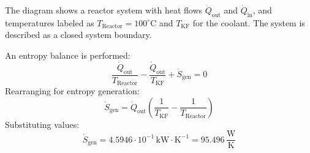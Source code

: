 The diagram shows a reactor system with heat flows \( \dot{Q}_{\text{out}} \) and \( \dot{Q}_{\text{in}} \), and temperatures labeled as \( T_{\text{Reactor}} = 100^\circ\text{C} \) and \( T_{\text{KF}} \) for the coolant. The system is described as a closed system boundary.  

An entropy balance is performed:  
\[
\frac{\dot{Q}_{\text{out}}}{T_{\text{Reactor}}} - \frac{\dot{Q}_{\text{out}}}{T_{\text{KF}}} + \dot{S}_{\text{gen}} = 0
\]  
Rearranging for entropy generation:  
\[
\dot{S}_{\text{gen}} = \dot{Q}_{\text{out}} \left( \frac{1}{T_{\text{KF}}} - \frac{1}{T_{\text{Reactor}}} \right)
\]  
Substituting values:  
\[
\dot{S}_{\text{gen}} = 4.5946 \cdot 10^{-1} \, \text{kW} \cdot \text{K}^{-1} = 95.496 \, \frac{\text{W}}{\text{K}}
\]